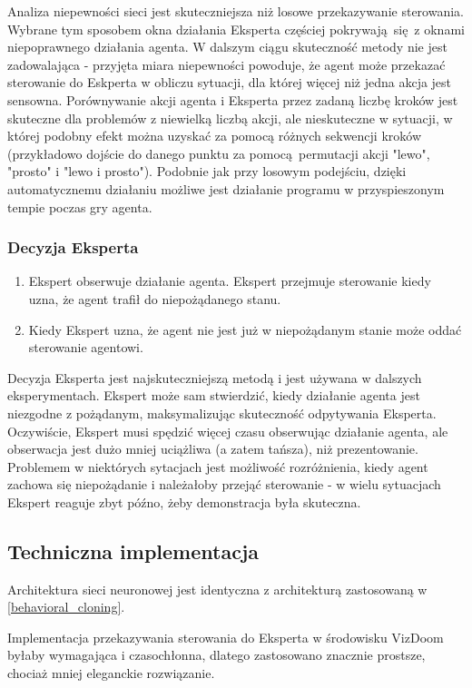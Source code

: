 Analiza niepewności sieci jest skuteczniejsza niż losowe przekazywanie sterowania. Wybrane tym sposobem okna działania Eksperta częściej pokrywają się z oknami niepoprawnego działania agenta. W dalszym ciągu skuteczność metody nie jest zadowalająca - przyjęta miara niepewności powoduje, że agent może przekazać sterowanie do Eskperta w obliczu sytuacji, dla której więcej niż jedna akcja jest sensowna. Porównywanie akcji agenta i Eksperta przez zadaną liczbę kroków jest skuteczne dla problemów z niewielką liczbą akcji, ale nieskuteczne w sytuacji, w której podobny efekt można uzyskać za pomocą różnych sekwencji kroków (przykładowo dojście do danego punktu za pomocą permutacji akcji "lewo", "prosto" i "lewo i prosto"). Podobnie jak przy losowym podejściu, dzięki automatycznemu działaniu możliwe jest działanie programu w przyspieszonym tempie poczas gry agenta.

\subsubsection{Decyzja Eksperta}\label{expert_call}
\begin{enumerate}
\item Ekspert obserwuje działanie agenta. Ekspert przejmuje sterowanie kiedy uzna, że agent trafił do niepożądanego stanu.
\item Kiedy Ekspert uzna, że agent nie jest już w niepożądanym stanie może oddać sterowanie agentowi.
\end{enumerate}

Decyzja Eksperta jest najskuteczniejszą metodą i jest używana w dalszych eksperymentach. Ekspert może sam stwierdzić, kiedy działanie agenta jest niezgodne z pożądanym, maksymalizując skuteczność odpytywania Eksperta. Oczywiście, Ekspert musi spędzić więcej czasu obserwując działanie agenta, ale obserwacja jest dużo mniej uciążliwa (a zatem tańsza), niż prezentowanie. Problemem w niektórych sytacjach jest możliwość rozróżnienia, kiedy agent zachowa się niepożądanie i należałoby przejąć sterowanie - w wielu sytuacjach Ekspert reaguje zbyt późno, żeby demonstracja była skuteczna.

\subsection{Techniczna implementacja}

Architektura sieci neuronowej jest identyczna z architekturą zastosowaną w \ref{behavioral_cloning}.

Implementacja przekazywania sterowania do Eksperta w środowisku VizDoom byłaby wymagająca i czasochłonna, dlatego zastosowano znacznie prostsze, chociaż mniej eleganckie rozwiązanie.

